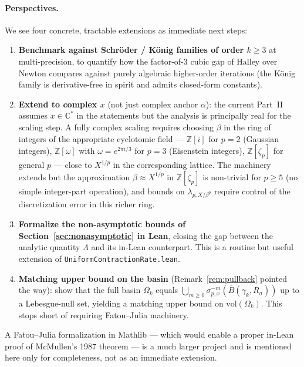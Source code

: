 \documentclass[11pt,a4paper]{article}
\theoremstyle{definition}
\begin{document}
\paragraph{Perspectives.} We see four concrete, tractable extensions as immediate next steps:
\begin{enumerate}
  \item \textbf{Benchmark against Schr\"oder / K\"onig families of order $k \geq 3$} at multi-precision, to quantify how the factor-of-3 cubic gap of Halley over Newton compares against purely algebraic higher-order iterations (the König family is derivative-free in spirit and admits closed-form constants).
  \item \textbf{Extend to complex $x$} (not just complex anchor $\alpha$): the current Part~II assumes $x \in \mathbb{C}^\ast$ in the statements but the analysis is principally real for the scaling step. A fully complex scaling requires choosing $\beta$ in the ring of integers of the appropriate cyclotomic field --- $\mathbb{Z}[i]$ for $p = 2$ (Gaussian integers), $\mathbb{Z}[\omega]$ with $\omega = e^{2\pi i/3}$ for $p = 3$ (Eisenstein integers), $\mathbb{Z}[\zeta_p]$ for general $p$ --- close to $X^{1/p}$ in the corresponding lattice. The machinery extends but the approximation $\beta \approx X^{1/p}$ in $\mathbb{Z}[\zeta_p]$ is non-trivial for $p \geq 5$ (no simple integer-part operation), and bounds on $\lambda_{p, X/\beta^p}$ require control of the discretization error in this richer ring.
  \item \textbf{Formalize the non-asymptotic bounds of Section~\ref{sec:nonasymptotic} in Lean}, closing the gap between the analytic quantity $\Lambda$ and its in-Lean counterpart. This is a routine but useful extension of \texttt{UniformContractionRate.lean}.
  \item \textbf{Matching upper bound on the basin} (Remark~\ref{rem:pullback} pointed the way): show that the full basin $\Omega_k$ equals $\bigcup_{m \geq 0} \sigma_{p,x}^{-m}(\overline{B}(\gamma_k, R_\sigma))$ up to a Lebesgue-null set, yielding a matching upper bound on $\mathrm{vol}(\Omega_k)$. This stops short of requiring Fatou--Julia machinery.
\end{enumerate}
A Fatou--Julia formalization in Mathlib --- which would enable a proper in-Lean proof of McMullen's 1987 theorem --- is a much larger project and is mentioned here only for completeness, not as an immediate extension.
\end{document}
